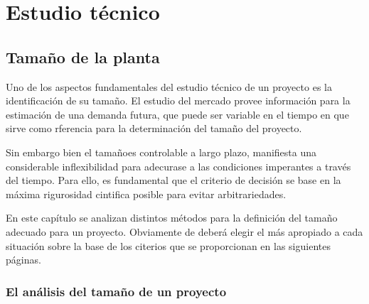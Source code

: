 \chapter{Estudio técnico}
\section{Tamaño de la planta}
Uno de los aspectos fundamentales del estudio técnico de un proyecto es la identificación
de su tamaño. El estudio del mercado provee información para la estimación de una demanda
futura, que puede ser variable en el tiempo en que sirve como rferencia para la determinación
del tamaño del proyecto.

Sin embargo bien el tamañoes controlable a largo plazo, manifiesta una considerable
inflexibilidad para adecurase a las condiciones imperantes a través del tiempo. Para ello,
es fundamental que el criterio de decisión se base en la máxima rigurosidad cintifica
posible para evitar arbitrariedades.

En este capítulo se analizan distintos métodos para la definición del tamaño adecuado para
un proyecto. Obviamente de deberá elegir el más apropiado a cada situación sobre la base
de los citerios que se proporcionan en las siguientes páginas.
\subsection{El análisis del tamaño de un proyecto}
